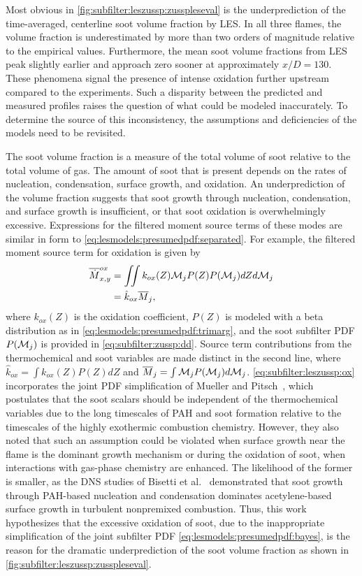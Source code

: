 Most obvious in \cref{fig:subfilter:leszussp:zusspleseval} is the underprediction of the time-averaged, centerline soot volume fraction by LES. In all three flames, the volume fraction is underestimated by more than two orders of magnitude relative to the empirical values. Furthermore, the mean soot volume fractions from LES peak slightly earlier and approach zero sooner at approximately $x/D = 130$. These phenomena signal the presence of intense oxidation further upstream compared to the experiments. Such a disparity between the predicted and measured profiles raises the question of what could be modeled inaccurately. To determine the source of this inconsistency, the assumptions and deficiencies of the models need to be revisited.

The soot volume fraction is a measure of the total volume of soot relative to the total volume of gas. The amount of soot that is present depends on the rates of nucleation, condensation, surface growth, and oxidation. An underprediction of the volume fraction suggests that soot growth through nucleation, condensation, and surface growth is insufficient, or that soot oxidation is overwhelmingly excessive. Expressions for the filtered moment source terms of these modes are similar in form to \cref{eq:lesmodels:presumedpdf:separated}. For example, the filtered moment source term for oxidation is given by
\begin{equation}\label{eq:subfilter:leszussp:ox}
  \begin{split}
    \overline{\dot{M}}_{x,y}^{ox} &= \iint k_{ox}(Z)\mathcal{M}_jP(Z)P(\mathcal{M}_j) dZ d\mathcal{M}_j \\
    &= \hat{k}_{ox}\overline{M}_j,
  \end{split}
\end{equation}
where $k_{ox}(Z)$ is the oxidation coefficient, $P(Z)$ is modeled with a beta distribution as in \cref{eq:lesmodels:presumedpdf:trimarg}, and the soot subfilter PDF $P(\mathcal{M}_j)$ is provided in \cref{eq:subfilter:zussp:dd}. Source term contributions from the thermochemical and soot variables are made distinct in the second line, where $\hat{k}_{ox} = \int k_{ox}(Z)P(Z)dZ$ and $\overline{M}_j = \int \mathcal{M}_j P(\mathcal{M}_j)d\mathcal{M}_j$. \cref{eq:subfilter:leszussp:ox} incorporates the joint PDF simplification of Mueller and Pitsch~\cite{subfilterpdf2011}, which postulates that the soot scalars should be independent of the thermochemical variables due to the long timescales of PAH and soot formation relative to the timescales of the highly exothermic combustion chemistry. However, they also noted that such an assumption could be violated when surface growth near the flame is the dominant growth mechanism or during the oxidation of soot, when interactions with gas-phase chemistry are enhanced. The likelihood of the former is smaller, as the DNS studies of Bisetti et al.~\cite{bisetti2012} demonstrated that soot growth through PAH-based nucleation and condensation dominates acetylene-based surface growth in turbulent nonpremixed combustion. Thus, this work hypothesizes that the excessive oxidation of soot, due to the inappropriate simplification of the joint subfilter PDF \cref{eq:lesmodels:presumedpdf:bayes}, is the reason for the dramatic underprediction of the soot volume fraction as shown in \cref{fig:subfilter:leszussp:zusspleseval}.


